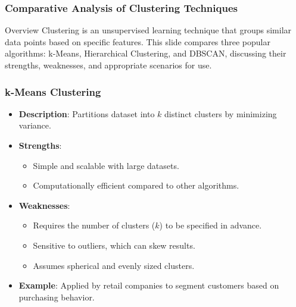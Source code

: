 \documentclass[aspectratio=169]{beamer}
\begin{document}
\begin{frame}[fragile]
    \frametitle{Comparative Analysis of Clustering Techniques}
    \begin{block}{Overview}
        Clustering is an unsupervised learning technique that groups similar data points 
        based on specific features. This slide compares three popular algorithms: 
        k-Means, Hierarchical Clustering, and DBSCAN, discussing their strengths, 
        weaknesses, and appropriate scenarios for use.
    \end{block}
\end{frame}

\begin{frame}[fragile]
    \frametitle{k-Means Clustering}
    \begin{itemize}
        \item \textbf{Description}: Partitions dataset into $k$ distinct clusters by minimizing variance.
        \item \textbf{Strengths}:
            \begin{itemize}
                \item Simple and scalable with large datasets.
                \item Computationally efficient compared to other algorithms.
            \end{itemize}
        \item \textbf{Weaknesses}:
            \begin{itemize}
                \item Requires the number of clusters ($k$) to be specified in advance.
                \item Sensitive to outliers, which can skew results.
                \item Assumes spherical and evenly sized clusters.
            \end{itemize}
        \item \textbf{Example}: Applied by retail companies to segment customers based on purchasing behavior.
    \end{itemize}
\end{frame}
\end{document}
